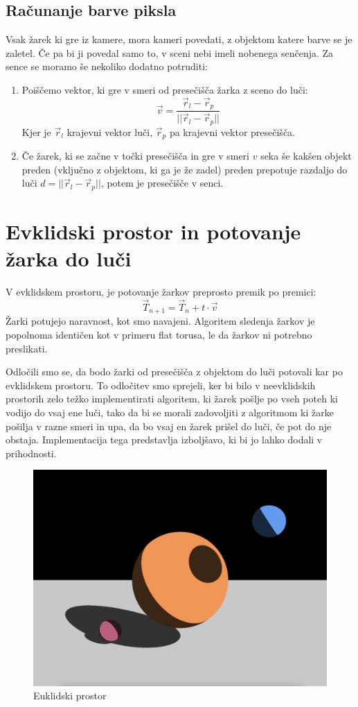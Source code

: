 \documentclass[titlepage]{article}
\begin{document}
\subsection{Računanje barve piksla}
Vsak žarek ki gre iz kamere, mora kameri povedati, z objektom katere barve se je zaletel. Če pa bi ji povedal
samo to, v sceni nebi imeli nobenega senčenja. Za sence se moramo še nekoliko dodatno potruditi:
\begin{enumerate}
  \item Poiščemo vektor, ki gre v smeri od presečišča žarka z sceno do luči: 
  \[ \vec{v} = \frac{\vec{r}_{l} - \vec{r}_{p}}{||\vec{r}_{l} - \vec{r}_{p}||} \]
  Kjer je \( \vec{r}_{l} \) krajevni vektor luči, \( \vec{r}_{p} \) pa krajevni vektor presečišča.
  \item Če žarek, ki se začne v točki presečišča in gre v smeri \( v \) seka še kakšen objekt preden 
  (vključno z objektom, ki ga je že zadel) preden prepotuje razdaljo do luči 
  \( d = ||\vec{r}_{l} - \vec{r}_{p}||\), potem je presečišče v senci.
\end{enumerate}


\section{Evklidski prostor in potovanje žarka do luči}

V evklidskem prostoru, je potovanje žarkov preprosto premik po premici: 
\[ \vec{T}_{n+1} = \vec{T}_{n} + t \cdot \vec{v} \]
Žarki potujejo naravnost, kot smo navajeni. Algoritem sledenja žarkov je popolnoma identičen
kot v primeru flat torusa, le da žarkov ni potrebno preslikati. 

Odločili smo se, da bodo žarki od presečišča z objektom do luči potovali kar po evklidskem prostoru. 
To odločitev smo sprejeli, ker bi bilo v neevklidskih prostorih zelo težko implementirati algoritem, 
ki žarek pošlje po vseh poteh ki vodijo do vsaj ene luči, tako da bi se morali zadovoljiti z algoritmom 
ki žarke pošilja v razne smeri in upa, da bo vsaj en žarek prišel do luči, če pot do nje obstaja. 
Implementacija tega predstavlja izboljšavo, ki bi jo lahko dodali v prihodnosti.

\begin{figure}[H]
  \centering
  \includegraphics[width=0.7\linewidth]{Images/Euclidean_blaz.png}
  \caption{Euklidski prostor}
  \label{Slika:Euklidski prostor}
\end{figure}
\end{document}
